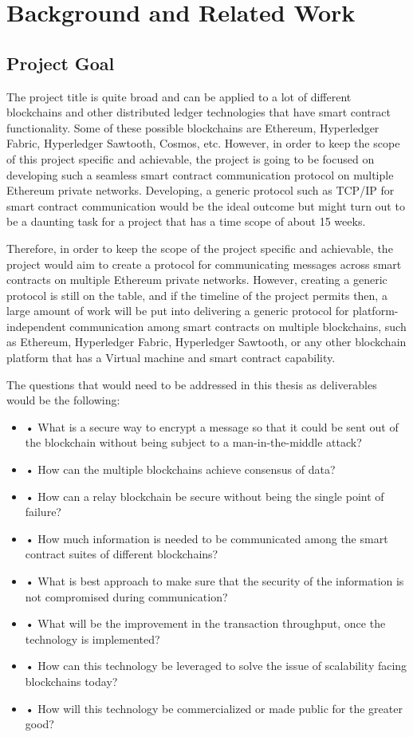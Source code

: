 \documentclass[a4paper,twoside,phd]{BYUPhys}
\begin{document}
\chapter{Background and Related Work}

\section{Project Goal}
The project title is quite broad and can be applied to a lot of different blockchains and other distributed ledger technologies that have smart contract functionality. Some of these possible blockchains are Ethereum, Hyperledger Fabric, Hyperledger Sawtooth, Cosmos, etc. However, in order to keep the scope of this project specific and achievable, the project is going to be focused on developing such a seamless smart contract communication protocol on multiple Ethereum private networks. Developing, a generic protocol such as TCP/IP for smart contract communication would be the ideal outcome but might turn out to be a daunting task for a project that has a time scope of about 15 weeks. \par
\par
Therefore, in order to keep the scope of the project specific and achievable, the project would aim to create a protocol for communicating messages across smart contracts on multiple Ethereum private networks. However, creating a generic protocol is still on the table, and if the timeline of the project permits then, a large amount of work will be put into delivering a generic protocol for platform-independent communication among smart contracts on multiple blockchains, such as Ethereum, Hyperledger Fabric, Hyperledger Sawtooth, or any other blockchain platform that has a Virtual machine and smart contract capability. \par
The questions that would need to be addressed in this thesis as deliverables would be the following:
\begin{itemize}
 

    \item• What is a secure way to encrypt a message so that it could be sent out of the blockchain without being subject to a man-in-the-middle attack?
    \item• How can the multiple blockchains achieve consensus of data?
    \item• How can a relay blockchain be secure without being the single point of failure?
    \item• How much information is needed to be communicated among the smart contract suites
of different blockchains?
    \item• What is best approach to make sure that the security of the information is not
compromised during communication?
    \item• What will be the improvement in the transaction throughput, once the technology is
implemented?
    \item• How can this technology be leveraged to solve the issue of scalability facing
blockchains today?
    \item• How will this technology be commercialized or made public for the greater good?
\end{itemize}
\end{document}
